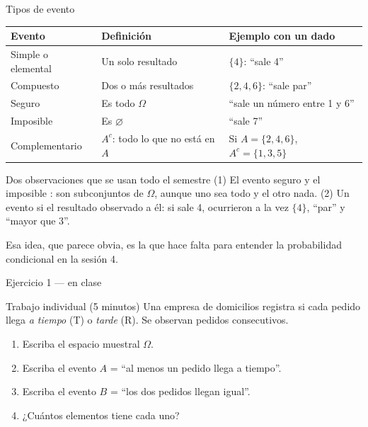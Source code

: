 \documentclass[aspectratio=169,10pt]{beamer}
\begin{document}
\begin{frame}{Tipos de evento}
  \scriptsize
  \begin{center}
  \begin{tabular}{@{}p{2.8cm}p{3.6cm}p{5.2cm}@{}}
    \toprule
    \textbf{Evento} & \textbf{Definición} & \textbf{Ejemplo con un dado} \\
    \midrule
    Simple o elemental & Un solo resultado & $\{4\}$: ``sale 4'' \\
    Compuesto & Dos o más resultados & $\{2,4,6\}$: ``sale par'' \\
    \addlinespace
    Seguro & Es todo $\Omega$ & ``sale un número entre 1 y 6'' \\
    Imposible & Es $\varnothing$ & ``sale 7'' \\
    \addlinespace
    Complementario & $A^{c}$: todo lo que no está en $A$ &
      Si $A=\{2,4,6\}$, \ $A^{c}=\{1,3,5\}$ \\
    \bottomrule
  \end{tabular}
  \end{center}

  \vspace{0.1cm}
  \begin{alertblock}{Dos observaciones que se usan todo el semestre}
    \scriptsize
    (1) El evento seguro y el imposible : son
    subconjuntos de $\Omega$, aunque uno sea todo y el otro nada. \quad
    (2) Un evento  si el resultado observado 
    a él: si sale 4, ocurrieron a la vez $\{4\}$, ``par'' y ``mayor que 3''.
  \end{alertblock}

  \vspace{0.05cm}
  {\tiny\color{uniGris}  Esa idea, que parece obvia, es la que hace falta para entender la
  probabilidad condicional en la sesión 4.}
\end{frame}

\begin{frame}{Ejercicio 1 — en clase}
  \begin{alertblock}{Trabajo individual (5 minutos)}
    Una empresa de domicilios registra si cada pedido llega \emph{a tiempo}
    (T) o \emph{tarde} (R). Se observan  pedidos consecutivos.

    \vspace{0.3cm}
    \begin{enumerate}
      \item Escriba el espacio muestral $\Omega$.
      \item Escriba el evento $A$ = ``al menos un pedido llega a tiempo''.
      \item Escriba el evento $B$ = ``los dos pedidos llegan igual''.
      \item ¿Cuántos elementos tiene cada uno?
    \end{enumerate}
  \end{alertblock}
\end{frame}
\end{document}
